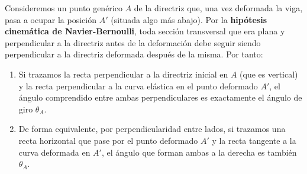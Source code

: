 Consideremos un punto genérico $A$ de la directriz que, una vez deformada la viga, pasa a ocupar la posición $A'$ (situada algo más abajo). Por la \textbf{hipótesis cinemática de Navier-Bernoulli}, toda sección transversal que era plana y perpendicular a la directriz antes de la deformación debe seguir siendo perpendicular a la directriz deformada después de la misma. Por tanto:
\begin{enumerate}
    \item Si trazamos la recta perpendicular a la directriz inicial en $A$ (que es vertical) y la recta perpendicular a la curva elástica en el punto deformado $A'$, el ángulo comprendido entre ambas perpendiculares es exactamente el ángulo de giro $\theta_A$.
    \item De forma equivalente, por perpendicularidad entre lados, si trazamos una recta horizontal que pase por el punto deformado $A'$ y la recta tangente a la curva deformada en $A'$, el ángulo que forman ambas a la derecha es también $\theta_A$.
\end{enumerate}

